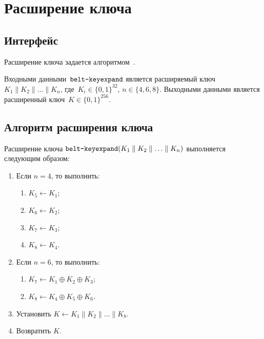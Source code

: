 \section{Расширение ключа}\label{KEYEXPAND}

\subsection{Интерфейс}\label{KEYEXPAND.IFace}

Расширение ключа задается алгоритмом~.

Входными данными~$\texttt{belt-keyexpand}$ является 
расширяемый ключ $K_1\parallel K_2\parallel\ldots\parallel K_n$,
где~$K_i\in\{0,1\}^{32}$, $n\in\{4,6,8\}$.
%
Выходными данными является расширенный ключ~$K\in\{0,1\}^{256}$.

\subsection{Алгоритм расширения ключа}\label{KEYEXPAND.Algo}

Расширение ключа 
$\texttt{belt-keyexpand}(K_1\parallel 
K_2\parallel\ldots\parallel K_n)$ 
выполняется следующим образом:
\begin{enumerate}
\item
Если $n=4$, то выполнить:
\begin{enumerate}
\item
$K_5\leftarrow K_1$;
\item
$K_6\leftarrow K_2$;
\item
$K_7\leftarrow K_3$;
\item
$K_8\leftarrow K_4$.
\end{enumerate}

\item
Если $n=6$, то выполнить:
\begin{enumerate}
\item
$K_7\leftarrow K_1\oplus K_2\oplus K_3$;
\item
$K_8\leftarrow K_4\oplus K_5\oplus K_6$.
\end{enumerate}

\item
Установить 
$K\leftarrow K_1\parallel K_2\parallel\ldots\parallel K_8$.

\item
Возвратить $K$.
\end{enumerate}
